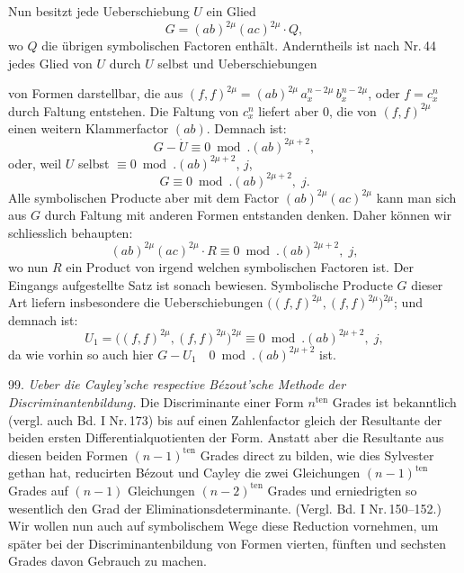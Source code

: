 \documentclass[11pt]{article}
\providecommand{\weberpage}[1]{}
\begin{document}
Nun besitzt jede Ueberschiebung $U$ ein Glied
\[
G = (ab)^{2\mu}(ac)^{2\mu}\cdot Q,
\]
wo $Q$ die übrigen symbolischen Factoren enthält. Anderntheils ist
nach Nr.\,44 jedes Glied von $U$ durch $U$ selbst und Ueberschiebungen


\weberpage{108}
von Formen darstellbar, die aus $(f,f)^{2\mu} = (ab)^{2\mu}\,a_x^{n-2\mu}\,b_x^{n-2\mu}$, oder
$f = c_x^n$ durch Faltung entstehen. Die Faltung von $c_x^n$ liefert aber 0,
die von $(f,f)^{2\mu}$ einen weitern Klammerfactor $(ab)$. Demnach ist:
\[
G - \dot U \equiv 0 \bmod. (ab)^{2\mu+2}, %
\]
oder, weil $U$ selbst $\equiv 0 \bmod. (ab)^{2\mu+2}$, $j$,
\[
G \equiv 0 \bmod. (ab)^{2\mu+2}, \; j.
\]
Alle symbolischen Producte aber mit dem Factor $(ab)^{2\mu}(ac)^{2\mu}$ kann
man sich aus $G$ durch Faltung mit anderen Formen entstanden denken.
Daher können wir schliesslich behaupten:
\[
(ab)^{2\mu}(ac)^{2\mu}\cdot R \equiv 0 \bmod. (ab)^{2\mu+2}, \; j,
\]
wo nun $R$ ein Product von irgend welchen symbolischen Factoren ist.
Der Eingangs aufgestellte Satz ist sonach bewiesen. Symbolische
Producte $G$ dieser Art liefern insbesondere die Ueberschiebungen
$\big((f,f)^{2\mu}, (f,f)^{2\mu}\big)^{2\mu}$; und demnach ist:
\[
U_1 = \big((f,f)^{2\mu}, (f,f)^{2\mu}\big)^{2\mu} \equiv 0 \bmod. (ab)^{2\mu+2}, \; j, %
\]
da wie vorhin so auch hier $G - U_1 \quad 0 \bmod. (ab)^{2\mu+2}$ ist. %

99. \textit{Ueber die Cayley'sche respective Bézout'sche Methode der
Discriminantenbildung.} Die Discriminante einer Form $n^{\text{ten}}$ Grades ist
bekanntlich (vergl. auch Bd. I Nr.\,173) bis auf einen Zahlenfactor gleich
der Resultante der beiden ersten Differentialquotienten der Form.
Anstatt aber die Resultante aus diesen beiden Formen $(n-1)^{\text{ten}}$ Grades
direct zu bilden, wie dies Sylvester gethan hat, reducirten Bézout und
Cayley die zwei Gleichungen $(n-1)^{\text{ten}}$ Grades auf $(n-1)$ Gleichungen
$(n-2)^{\text{ten}}$ Grades und erniedrigten so wesentlich den Grad der Eliminationsdeterminante.
(Vergl. Bd. I Nr.\,150--152.) Wir wollen nun auch auf
symbolischem Wege diese Reduction vornehmen, um später bei der
Discriminantenbildung von Formen vierten, fünften und sechsten
Grades davon Gebrauch zu machen.
\end{document}

